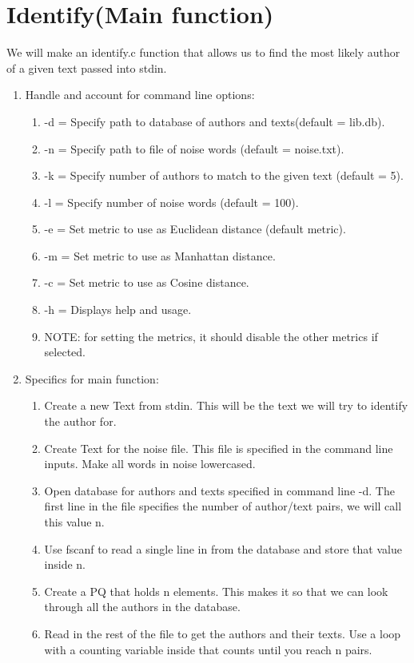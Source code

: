 \documentclass[11pt]{article}
\begin{document}
\section{Identify(Main function)}\label{ss:main}
We will make an identify.c function that allows us to find the most likely author of a given text passed into stdin.

\begin{enumerate}
\item Handle and account for command line options:
	\begin{enumerate}
	\item -d = Specify path to database of authors and texts(default = lib.db).
	\item -n = Specify path to file of noise words (default = noise.txt).
	\item -k = Specify number of authors to match to the given text (default = 5).
	\item -l = Specify number of noise words (default = 100).
	\item -e = Set metric to use as Euclidean distance (default metric).
	\item -m = Set metric to use as Manhattan distance.
	\item -c = Set metric to use as Cosine distance.
	\item -h = Displays help and usage.
	\item NOTE: for setting the metrics, it should disable the other metrics if selected.
	\end{enumerate}
\item Specifics for main function:
	\begin{enumerate}
	\item Create a new Text from stdin. This will be the text we will try to identify the author for.
	\item Create Text for the noise file. This file is specified in the command line inputs. Make all words in noise lowercased.
	\item Open database for authors and texts specified in command line -d. The first line in the file specifies the number of author/text pairs, we will call this value n.
	\item Use fscanf to read a single line in from the database and store that value inside n.
	\item Create a PQ that holds n elements. This makes it so that we can look through all the authors in the database.
	\item Read in the rest of the file to get the authors and their texts. Use a loop with a counting variable inside that counts until you reach n pairs.

\end{enumerate}
\end{enumerate}
\end{document}

